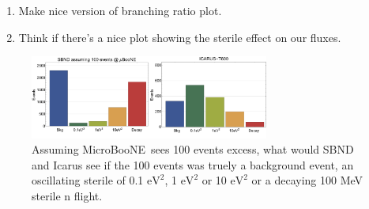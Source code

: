 \documentclass[11pt, a4paper]{article}
\def\muboone{MicroBooNE}
\newcommand{\newtext}[2]{\textcolor{#1}{\ul{#2}}}
\begin{document}
\begin{enumerate}
\item Make nice version of branching ratio plot. 

\item Think if there's a nice plot showing the sterile effect on our fluxes.


%


	\end{enumerate}



	
\begin{figure}[t]
\center
\includegraphics[width=0.7\textwidth]{figures/baseline_comp.pdf}
\caption{\label{fig:baseline_comp} Assuming \muboone\ sees 100 events excess, what would SBND and Icarus see if the 100 events was truely a background event, an oscillating sterile of 0.1 $\text{eV}^2$, 1  $\text{eV}^2$ or 10 $\text{eV}^2$ or a decaying 100 MeV sterile n flight. }
\end{figure}




{}
\end{document}
